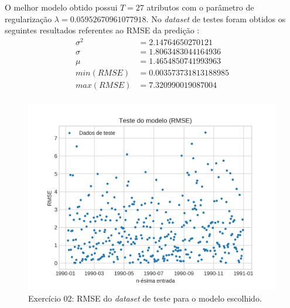 \documentclass{article}
\begin{document}
    O melhor modelo obtido possui $T=27$ atributos com o parâmetro de regularização $\lambda=0.05952670961077918$.
    No \textit{dataset} de testes foram obtidos os seguintes resultados referentes ao RMSE da predição :
    \begin{align}
        \sigma^2&=2.14764650270121\\
        \sigma&=1.8063483044164936\\
        \mu&=1.4654850741993963\\
        min(RMSE)&=0.003573731813188985\\
        max(RMSE)&=7.320990019087004\\
    \end{align}
    \begin{figure}[!ht]
        \centering
        \includegraphics[width=\linewidth]{ex02/model_rmse.png}
        \caption{Exercício 02: RMSE do \textit{dataset} de teste para o modelo escolhido.}
        \label{fig:ex2_rmse}
    \end{figure}
\end{document}
